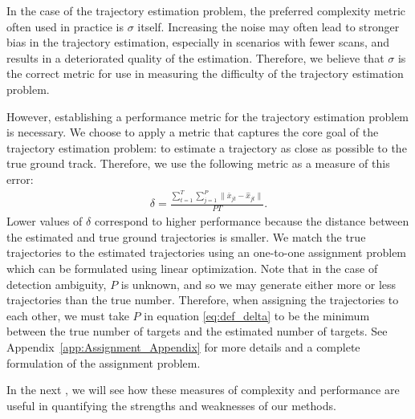 In the case of the trajectory estimation problem, the preferred complexity metric often used in practice is $\sigma$ itself. Increasing the noise may often lead to stronger bias in the trajectory estimation, especially in scenarios with fewer scans, and results in a deteriorated quality of the estimation. Therefore, we believe that $\sigma$ is the correct metric for use in measuring the difficulty of the trajectory estimation problem. 

However, establishing a performance metric for the trajectory estimation problem is necessary. We choose to apply a metric that captures the core goal of the trajectory estimation problem: to estimate a trajectory as close as possible to the true ground track. Therefore, we use the following metric as a measure of this error: 
\begin{align}\label{eq:def_delta}
	\delta = \frac{\sum\limits_{t=1}^{T}\sum\limits_{j=1}^{P}\| \bar{x}_{jt} - \hat{x}_{jt} \|}{PT}.
\end{align}
Lower values of $\delta$ correspond to higher performance because the distance between the estimated and true ground trajectories is smaller. We match the true trajectories to the estimated trajectories using an one-to-one assignment problem which can be formulated using linear optimization. Note that in the case of detection ambiguity, $P$ is unknown, and so we may generate either more or less trajectories than the true number. Therefore, when assigning the trajectories to each other, we must take $P$ in equation \eqref{eq:def_delta} to be the minimum between the true number of targets and the estimated number of targets. See Appendix~\ref{app:Assignment_Appendix} for more details and a complete formulation of the assignment problem. 

In the next \mytitle, we will see how these measures of complexity and performance are useful in quantifying the strengths and weaknesses of our methods.

